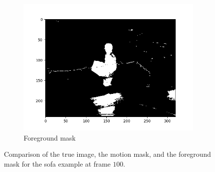 \begin{figure}[!ht]
\begin{subfigure}{.3\textwidth}
        \includegraphics[width=\textwidth]{sofa_fg_frame_100.png}
        \caption{Foreground mask}
    \end{subfigure}
    \caption{Comparison of the true image, the motion mask, and the foreground mask for the sofa example at frame $100$.}\label{fig:sofa-frame-100}
\end{figure}
